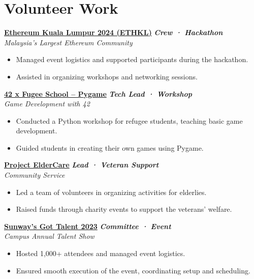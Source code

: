 \documentclass[letterpaper,10pt]{article}
\newcommand{\heading}[2]{
  \hspace{4pt}#1\hfill#2\\
}
\newcommand{\headingBf}[2]{
  \heading{\textbf{#1}}{
    \textbf{\textit{\small{#2}}}
  }
}
\newenvironment{bulletList}{
  \begin{itemize}[itemsep=1pt, parsep=1pt, leftmargin=26pt]
}{
  \end{itemize}
}
\newcommand{\oneFrag}[4]{
  \headingBf{#1}{#2}
  \hspace{6pt}\textit{#3}
  \vspace{-4pt}
  #4
}
\begin{document}

\section{Volunteer Work}

\oneFrag{
  \href{https://www.2024.ethkl.org}{Ethereum Kuala Lumpur 2024 (ETHKL)}
}{
  Crew · Hackathon
}{
  Malaysia's Largest Ethereum Community
}{
  \begin{bulletList}
    \item Managed event logistics and supported participants during the hackathon.
    \item Assisted in organizing workshops and networking sessions.
  \end{bulletList}
}

\vspace{2pt}
\oneFrag{
  \href{https://www.linkedin.com/feed/update/urn:li:activity:7219932643142901760}{42 x Fugee School -- Pygame}
}{
  Tech Lead · Workshop
}{
  Game Development with 42
}{
  \begin{bulletList}
    \item Conducted a Python workshop for refugee students, teaching basic game development.
    \item Guided students in creating their own games using Pygame.
  \end{bulletList}
}

\vspace{2pt}
\oneFrag{
  \href{https://linktr.ee/project.eldercare}{Project ElderCare}
}{
  Lead · Veteran Support
}{
  Community Service
}{
  \begin{bulletList}
    \item Led a team of volunteers in organizing activities for elderlies.
    \item Raised funds through charity events to support the veterans' welfare.
  \end{bulletList}
}

\vspace{2pt}
\oneFrag{
  \href{https://www.linkedin.com/feed/update/urn:li:activity:7092021655891316736}{Sunway's Got Talent 2023}
}{
  Committee · Event
}{
  Campus Annual Talent Show
}{
  \begin{bulletList}
    \item Hosted 1,000+ attendees and managed event logistics.
    \item Ensured smooth execution of the event, coordinating setup and scheduling.
  \end{bulletList}
}
\end{document}
